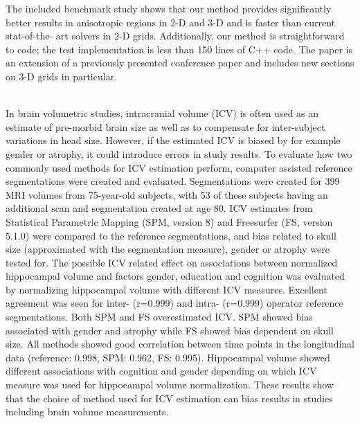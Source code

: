 {{\begin{enumerate}
The included benchmark study shows that our method provides significantly better results in anisotropic regions in 2-D and 3-D and is faster than current stat-of-the- art solvers in 2-D grids. Additionally, our method is straightforward to code; the test implementation is less than 150 lines of C++ code. The paper is an extension of a previously presented conference paper and includes new sections on 3-D grids in particular. 
 
\\ \aabstract
In brain volumetric studies, intracranial volume (ICV) is often used as an estimate of pre-morbid brain size as well as to compensate for inter-subject variations in head size. However, if the estimated ICV is biased by for example gender or atrophy, it could introduce errors in study results. To evaluate how two commonly used methods for ICV estimation perform, computer assisted reference segmentations were created and evaluated. Segmentations were created for 399 MRI volumes from 75-year-old subjects, with 53 of these subjects having an additional scan and segmentation created at age 80. ICV estimates from Statistical Parametric Mapping (SPM, version 8) and Freesurfer (FS, version 5.1.0) were compared to the reference segmentations, and bias related to skull size (approximated with the segmentation measure), gender or atrophy were tested for. The possible ICV related effect on associations between normalized hippocampal volume and factors gender, education and cognition was evaluated by normalizing hippocampal volume with different ICV measures. Excellent agreement was seen for inter- (r=0.999) and intra- (r=0.999) operator reference segmentations. Both SPM and FS overestimated ICV. SPM showed bias associated with gender and atrophy while FS showed bias dependent on skull size. All methods showed good correlation between time points in the longitudinal data (reference: 0.998, SPM: 0.962, FS: 0.995). Hippocampal volume showed different associations with cognition and gender depending on which ICV measure was used for hippocampal volume normalization. These results show that the choice of method used for ICV estimation can bias results in studies including brain volume measurements.


\end{enumerate}}}
